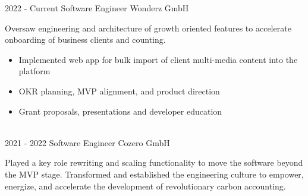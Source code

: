 \vspace{-10 pt}
\begin{entrylist}
	\entry
        {2022 - Current}
		{Software Engineer}
		{Wonderz GmbH}
		{
      Oversaw engineering and architecture of growth oriented features to accelerate onboarding of business clients and counting.
        
      \vspace{10pt}
        \begin{itemize}[noitemsep,topsep=0pt,parsep=0pt,partopsep=0pt, leftmargin=-1pt]
            \item Implemented web app for bulk import of client multi-media content into the platform
            \item OKR planning, MVP alignment, and product direction
            \item Grant proposals, presentations and developer education
        \end{itemize}
        }\\
	\entry
		{2021 - 2022}
		{Software Engineer}
		{Cozero GmbH}
		{
Played a key role rewriting and scaling functionality to move the software beyond the MVP stage.
Transformed and established the engineering culture to empower, energize, and accelerate the
development of revolutionary carbon accounting.
      \vspace{10pt}

}
\end{entrylist}
